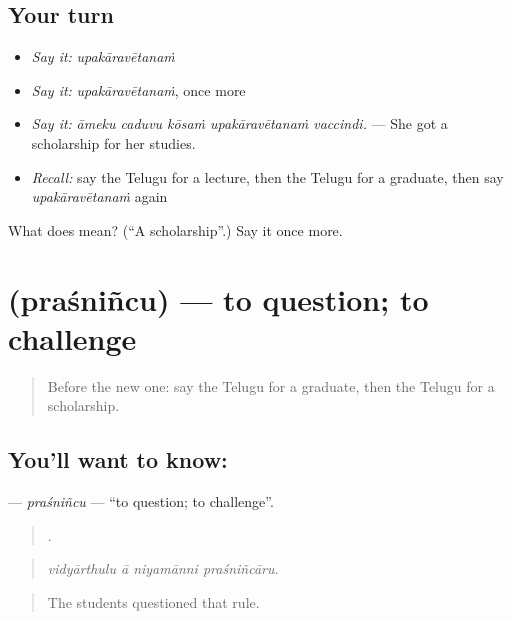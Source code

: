 \subsection*{Your turn}
\begin{itemize}
\raggedright
  \item \emph{Say it:} \emph{upakāravētanaṁ}
  \item \emph{Say it:} \emph{upakāravētanaṁ}, once more
  \item \emph{Say it:} \emph{āmeku caduvu kōsaṁ upakāravētanaṁ vaccindi.} — She got a scholarship for her studies.
  \item \emph{Recall:} say the Telugu for a lecture, then the Telugu for a graduate, then say \emph{upakāravētanaṁ} again
\end{itemize}

\begin{tcolorbox}[breakable,colback=teal!4,colframe=teal!35!black,title={Before you move on}]
What does  mean? (\textquotedblleft{}A scholarship\textquotedblright{}.) Say it once more.
\end{tcolorbox}
\section[\texorpdfstring{\te{ప్రశ్నించు} (praśniñcu)}{ప్రశ్నించు (praśniñcu)}]{ (praśniñcu) — to question; to challenge}

\label{lesson:TE-C414-prasnincu}



\begin{quote}
Before the new one: say the Telugu for a graduate, then the Telugu for a scholarship.
\end{quote}

\subsection*{You'll want to know: }
\textbf{} — \emph{praśniñcu} — \textquotedblleft{}to question; to challenge\textquotedblright{}.

\begin{quote}
   .
\end{quote}

\begin{quote}
\emph{vidyārthulu ā niyamānni praśniñcāru.}
\end{quote}

\begin{quote}
The students questioned that rule.
\end{quote}

